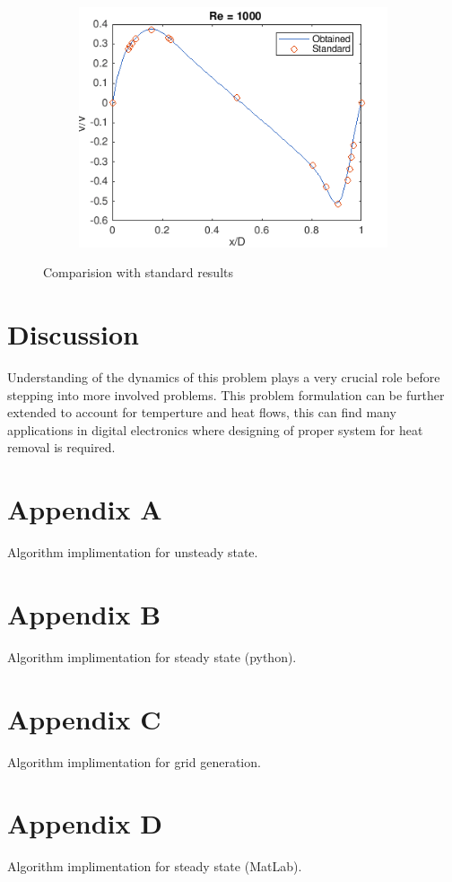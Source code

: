 \documentclass{article}
\begin{document}
\begin{figure}
\begin{subfigure}[b]{0.3\textwidth}
    \includegraphics[width=\textwidth]{43.png}
  \end{subfigure}
      \caption{Comparision with standard results}
\label{fig:res6s}
\end{figure}



\section{Discussion}
Understanding of the dynamics of this problem plays a very crucial role before stepping into more involved problems. This problem formulation can be further extended to account for temperture and heat flows, this can find many applications in digital electronics where designing of proper system for heat removal is required. 

\section*{Appendix A}
Algorithm implimentation for unsteady state.


\section*{Appendix B}
Algorithm implimentation for steady state (python).


\section*{Appendix C}
Algorithm implimentation for grid generation.


\section*{Appendix D}
Algorithm implimentation for steady state (MatLab).





\end{document}
